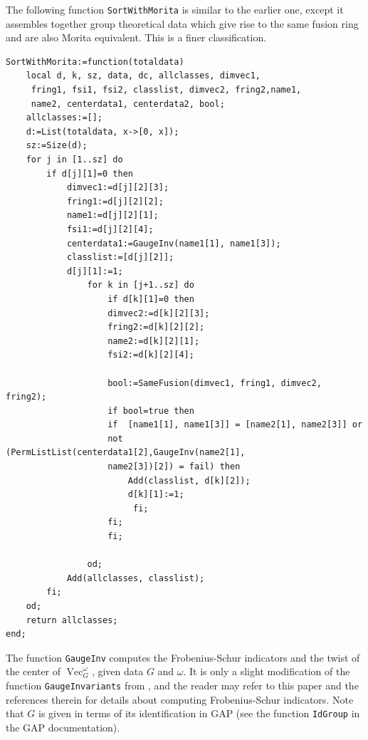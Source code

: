 \documentclass[a4paper, 10pt]{book}
\theoremstyle{definition}
\numberwithin{equation}{chapter}
\newcommand\lstl{\lstinline}
\newcommand\Vect{\operatorname{Vec}}
\begin{document}
The following function \lstl{SortWithMorita} is similar to the earlier one, except it assembles together group theoretical data which give rise to the same fusion ring and are also Morita equivalent. This is a finer classification.
\begin{lstlisting}
SortWithMorita:=function(totaldata)
    local d, k, sz, data, dc, allclasses, dimvec1, 
     fring1, fsi1, fsi2, classlist, dimvec2, fring2,name1, 
     name2, centerdata1, centerdata2, bool;
    allclasses:=[];
    d:=List(totaldata, x->[0, x]);
    sz:=Size(d);
    for j in [1..sz] do
        if d[j][1]=0 then
            dimvec1:=d[j][2][3];
            fring1:=d[j][2][2];
            name1:=d[j][2][1];
            fsi1:=d[j][2][4];
            centerdata1:=GaugeInv(name1[1], name1[3]);
            classlist:=[d[j][2]];
            d[j][1]:=1;
                for k in [j+1..sz] do
                    if d[k][1]=0 then
                    dimvec2:=d[k][2][3];
                    fring2:=d[k][2][2];
                    name2:=d[k][2][1];
                    fsi2:=d[k][2][4];
                    
                    bool:=SameFusion(dimvec1, fring1, dimvec2, fring2);
                    if bool=true then
                    if  [name1[1], name1[3]] = [name2[1], name2[3]] or 
                    not (PermListList(centerdata1[2],GaugeInv(name2[1], 
                    name2[3])[2]) = fail) then
                        Add(classlist, d[k][2]);
                        d[k][1]:=1;
                         fi;
                    fi;
                    fi;
                    
                od;            
            Add(allclasses, classlist);
        fi;
    od;
    return allclasses;
end;
\end{lstlisting}
The function \lstl{GaugeInv} computes the Frobenius-Schur indicators and the twist of the center of $\Vect^\omega_G$, given data $G$ and $\omega$. It is only a slight modification of the function \lstl{GaugeInvariants} from \cite{2017arXiv170806538M}, and the reader may refer to this paper and the references therein for details about computing Frobenius-Schur indicators. Note that $G$ is given in terms of its identification in GAP (see the function \lstl{IdGroup} in the GAP documentation).
\end{document}
